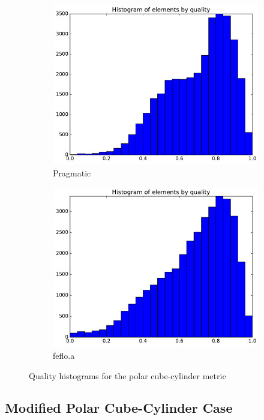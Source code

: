 \documentclass[3p,times,procedia,number]{elsarticle}
\begin{document}
\begin{figure}
\begin{subfigure}{.16\textwidth}
\includegraphics[width=\textwidth]{pragmatic-cube-cylinder-polar-1-quality.pdf}
\caption{Pragmatic}
\end{subfigure}
\begin{subfigure}{.16\textwidth}
\centering
\includegraphics[width=\textwidth]{fefloa-cube-cylinder-polar-1-quality.pdf}
\caption{feflo.a}
\end{subfigure}
\caption{Quality histograms for the polar cube-cylinder metric}
\label{fig:cube-cylinder-polar-1-qualities}
\end{figure}

\subsection{Modified Polar Cube-Cylinder Case}
\label{sec:cube-cylinder-polar-2}
\end{document}
